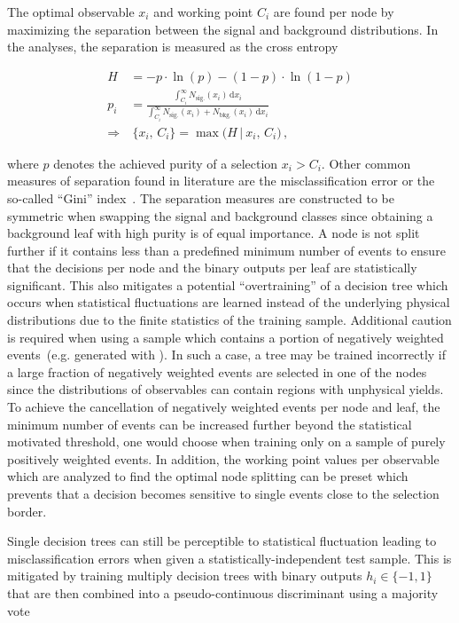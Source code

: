 The optimal observable $x_{i}$ and working point $C_{i}$  are found per node by maximizing the separation between the signal and background distributions. In the analyses, the separation is measured as the cross entropy 

\begin{align}
H&=-p\cdot\ln(p)-(1-p)\cdot\ln(1-p)\\ p_{i}&=\frac{\int_{C_{i}}^{\infty} N_\mathrm{sig.}(x_{i})\,\mathrm{d}x_{i}}{\int_{C_{i}}^{\infty} N_\mathrm{sig.}(x_{i})+N_\mathrm{bkg.}(x_{i})\,\mathrm{d}x_{i}}\\
\Rightarrow &~\{x_{i},\,C_{i}\}=\max\Big(H\,\big|~x_{i},\,C_{i}\Big)\,,
\end{align}

where $p$ denotes the achieved purity of a selection $x_{i}>C_{i}$. Other common measures of separation found in literature are the misclassification error or the so-called ``Gini'' index~\cite{Gini}. The separation measures are constructed to be symmetric when swapping the signal and background classes since obtaining a background leaf with high purity is of equal importance. A node is not split further if it contains less than a predefined minimum number of events to ensure that the decisions per node and the binary outputs per leaf are statistically significant. This also mitigates a potential ``overtraining'' of a decision tree which occurs when statistical fluctuations are learned instead of the underlying physical distributions due to the finite statistics of the training sample. Additional caution is required when using a sample which contains a portion of negatively weighted events~(e.g. generated with \MGAMC). In such a case, a tree may be trained incorrectly if a large fraction of negatively weighted events are selected in one of the nodes since the distributions of observables can contain regions with unphysical yields. To achieve the cancellation of negatively weighted events per node and leaf, the minimum number of events can be increased further beyond the statistical motivated threshold, one would choose when training only on a sample of purely positively weighted events. In addition, the working point values per observable which are analyzed to find the optimal node splitting can be preset which prevents that a decision becomes sensitive to single events close to the selection border.

Single decision trees can still be perceptible to statistical fluctuation leading to misclassification errors when given a statistically-independent test sample. This is mitigated by training multiply decision trees with binary outputs $h_{i}\in\{-1,1\}$ that are then combined into a pseudo-continuous discriminant using a majority vote

